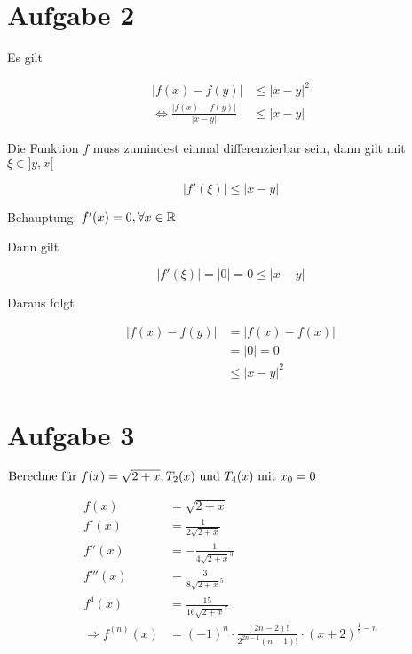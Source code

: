 \documentclass[a4paper, 11pt]{article}
\begin{document}
\section{Aufgabe 2}
\label{sec:org033ce5e}
Es gilt

\begin{align*}
    |f(x) - f(y)| &\leq |x - y|^2 \\
    \Leftrightarrow \frac{|f(x) - f(y)|}{|x - y|} &\leq |x - y|
\end{align*}

Die Funktion \(f\) muss zumindest einmal differenzierbar sein, dann gilt mit \(\xi \in ]y, x[\)

\begin{equation*}
    |f'(\xi)| \leq |x - y|
\end{equation*}

Behauptung: \(f'(x) = 0, \forall x \in \mathbb{R}\)

Dann gilt

\begin{equation*}
    |f'(\xi)| = |0| = 0 \leq |x - y|
\end{equation*}

Daraus folgt

\begin{align*}
    |f(x) - f(y)| &= |f(x) - f(x)| \\
    &= |0| = 0 \\
    &\leq |x - y|^2
\end{align*}

\section{Aufgabe 3}
\label{sec:org78f30ce}
\begin{math}
    \text{Berechne für  }f(x) = \sqrt{2+x}, T_2(x)\text{ und }
        T_4(x) \text{ mit  }x_0 = 0
    \newline
\end{math}

\begin{align*}
    f(x) &= \sqrt{2+x} \\
    f'(x) &= \frac{1}{2\sqrt{2+x}} \\
    f''(x) &= -\frac{1}{4\sqrt{2+x}^3} \\
    f'''(x) &= \frac{3}{8\sqrt{2+x}^5} \\
    f^4(x) &= \frac{15}{16\sqrt{2+x}^7} \\
    \Rightarrow f^{(n)}(x) &= (-1)^n \cdot \frac{(2n-2)!}{2^{2n-1}(n-1)!} \cdot (x+2)^{\frac{1}{2}-n}
\end{align*}
\end{document}

